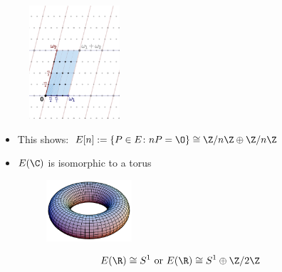 \begin{frame}[plain]
	\begin{figure}[!ht]
	\centering
	\includegraphics[width=0.3\textwidth]{images/lattice.png}
	\end{figure}

\begin{itemize}
\item This shows: $E[n]:= \{ P \in E \colon nP= \O \} \cong \Z/n\Z \oplus \Z/n\Z$
\item $E(\C)$ is isomorphic to a torus
	\begin{figure}[!ht]
	\centering
	\includegraphics[width=0.3\textwidth]{images/torus.png}
	\end{figure}
\end{itemize}
\end{frame}



\begin{frame}[plain]
\end{frame}



\begin{frame}[plain]
\phantom{x}\vfill
	\[
	E(\R) \cong S^1 \text{ or } E(\R) \cong S^1 \oplus \Z/2\Z
	\]
\vfill
\phantom{x}
\end{frame}



\begin{frame}[plain]
\end{frame}



\begin{frame}[plain]
\end{frame}



